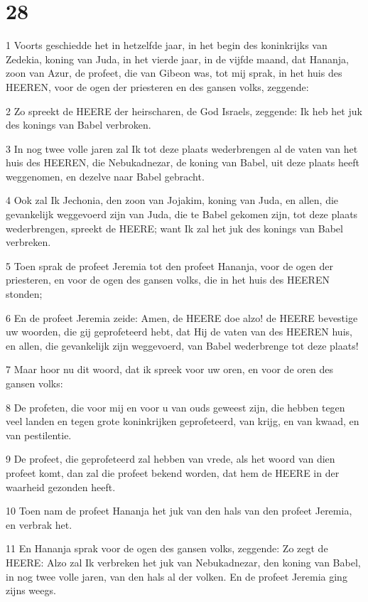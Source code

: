 \chapter{28}

\par 1 Voorts geschiedde het in hetzelfde jaar, in het begin des koninkrijks van Zedekia, koning van Juda, in het vierde jaar, in de vijfde maand, dat Hananja, zoon van Azur, de profeet, die van Gibeon was, tot mij sprak, in het huis des HEEREN, voor de ogen der priesteren en des gansen volks, zeggende:
\par 2 Zo spreekt de HEERE der heirscharen, de God Israels, zeggende: Ik heb het juk des konings van Babel verbroken.
\par 3 In nog twee volle jaren zal Ik tot deze plaats wederbrengen al de vaten van het huis des HEEREN, die Nebukadnezar, de koning van Babel, uit deze plaats heeft weggenomen, en dezelve naar Babel gebracht.
\par 4 Ook zal Ik Jechonia, den zoon van Jojakim, koning van Juda, en allen, die gevankelijk weggevoerd zijn van Juda, die te Babel gekomen zijn, tot deze plaats wederbrengen, spreekt de HEERE; want Ik zal het juk des konings van Babel verbreken.
\par 5 Toen sprak de profeet Jeremia tot den profeet Hananja, voor de ogen der priesteren, en voor de ogen des gansen volks, die in het huis des HEEREN stonden;
\par 6 En de profeet Jeremia zeide: Amen, de HEERE doe alzo! de HEERE bevestige uw woorden, die gij geprofeteerd hebt, dat Hij de vaten van des HEEREN huis, en allen, die gevankelijk zijn weggevoerd, van Babel wederbrenge tot deze plaats!
\par 7 Maar hoor nu dit woord, dat ik spreek voor uw oren, en voor de oren des gansen volks:
\par 8 De profeten, die voor mij en voor u van ouds geweest zijn, die hebben tegen veel landen en tegen grote koninkrijken geprofeteerd, van krijg, en van kwaad, en van pestilentie.
\par 9 De profeet, die geprofeteerd zal hebben van vrede, als het woord van dien profeet komt, dan zal die profeet bekend worden, dat hem de HEERE in der waarheid gezonden heeft.
\par 10 Toen nam de profeet Hananja het juk van den hals van den profeet Jeremia, en verbrak het.
\par 11 En Hananja sprak voor de ogen des gansen volks, zeggende: Zo zegt de HEERE: Alzo zal Ik verbreken het juk van Nebukadnezar, den koning van Babel, in nog twee volle jaren, van den hals al der volken. En de profeet Jeremia ging zijns weegs.

